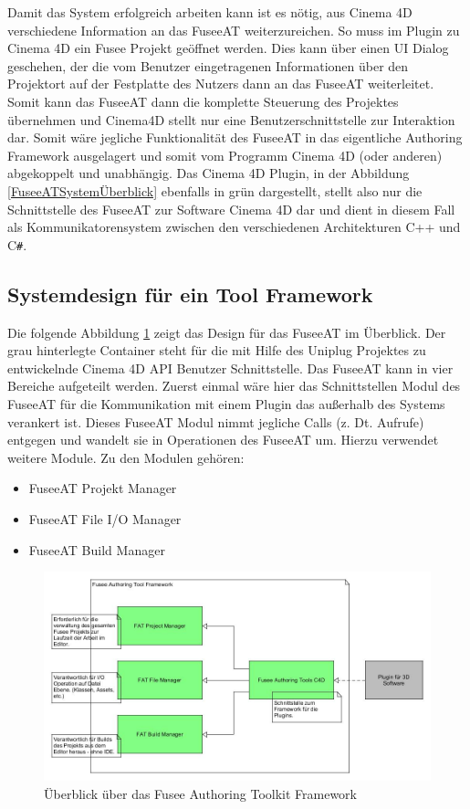 \documentclass[pagesize, paper=a4, fontsize=12pt, titlepage=true, headings=small, headnosepline, abstractoff, liststotoc, nochapterprefix, plainheadsepline, twoside]{scrreprt}
\newcommand{\CS}{C\texttt{\#}}
\begin{document}
Damit das System erfolgreich arbeiten kann ist es nötig, aus Cinema 4D verschiedene Information an das FuseeAT weiterzureichen. So muss im Plugin zu Cinema 4D ein Fusee Projekt geöffnet werden. Dies kann über einen UI Dialog geschehen, der die vom Benutzer eingetragenen Informationen über den Projektort auf der Festplatte des Nutzers dann an das FuseeAT weiterleitet. Somit kann das FuseeAT dann die komplette Steuerung des Projektes übernehmen und Cinema4D stellt nur eine Benutzerschnittstelle zur Interaktion dar. Somit wäre jegliche Funktionalität des FuseeAT in das eigentliche Authoring Framework ausgelagert und somit vom Programm Cinema 4D (oder anderen) abgekoppelt und unabhängig. Das Cinema 4D Plugin, in der Abbildung \ref{FuseeATSystemÜberblick} ebenfalls in grün dargestellt, stellt also nur die Schnittstelle des FuseeAT zur Software Cinema 4D dar und dient in diesem Fall als Kommunikatorensystem zwischen den verschiedenen Architekturen C++ und \CS.


\subsection{Systemdesign für ein Tool Framework}
Die folgende Abbildung \ref{FrameworkÜberblick} zeigt das Design für das FuseeAT im Überblick. Der grau hinterlegte Container steht für die mit Hilfe des Uniplug Projektes zu entwickelnde Cinema 4D API Benutzer Schnittstelle. Das FuseeAT kann in vier Bereiche aufgeteilt werden. Zuerst einmal wäre hier das Schnittstellen Modul des FuseeAT für die Kommunikation mit einem Plugin das außerhalb des Systems verankert ist. Dieses FuseeAT Modul nimmt jegliche Calls (z. Dt. Aufrufe) entgegen und wandelt sie in Operationen des FuseeAT um. Hierzu verwendet weitere Module. Zu den Modulen gehören:
\begin{itemize}
\item FuseeAT Projekt Manager
\item FuseeAT File I/O Manager
\item FuseeAT Build Manager
\end{itemize}

\begin{figure}[ht]
	\centering
	\includegraphics[width=\linewidth]{Bilder/Ueberblick_Framework.jpg}
	\caption{Überblick über das Fusee Authoring Toolkit Framework}
	\label{FrameworkÜberblick}
\end{figure}
\end{document}
